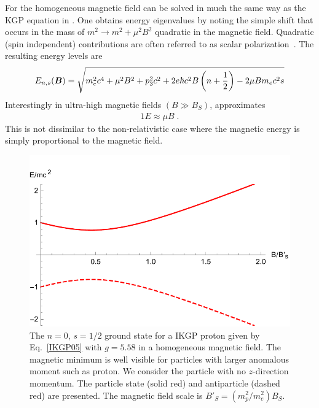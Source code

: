 For the homogeneous magnetic field  can be solved in much the same way as the KGP equation in . One obtains energy eigenvalues by noting the simple shift that occurs in the mass of $m^2\rightarrow m^{2}+\mu^{2}{B}^{2}$ quadratic in the magnetic field. Quadratic (spin independent) contributions are often referred to as scalar polarization~\citep{Holstein:2013kia}. The resulting energy levels are
\begin{alignat}{1}
\label{IKGP05} E_{n,s}(\boldsymbol{B})=\sqrt{m_{e}^{2}c^{4}+\mu^{2}{B}^{2}+p_{3}^{2}c^{2}+2e\hbar c^{2}B\left(n+\frac{1}{2}\right)-2\mu B m_{e}c^{2}s}
\end{alignat}
Interestingly in ultra-high magnetic fields $(B\gg{B}_{S})$,  approximates
\begin{alignat}{1}
\label{IKGP07} E\approx\mu B\;.
\end{alignat}
This is not dissimilar to the non-relativistic case where the magnetic energy is simply proportional to the magnetic field.

\begin{figure}[ht]
 \centering
 \includegraphics[clip, trim=0.0cm 0.0cm 0.0cm 0.5cm,width=\linewidth]{plots/chap02moment/lanplot09.pdf}
 \caption{The $n=0$, $s=1/2$ ground state for a IKGP proton given by Eq.~\eqref{IKGP05} with $g=5.58$ in a homogeneous magnetic field. The magnetic minimum is well visible for particles with larger anomalous moment such as proton. We consider the particle with no $z$-direction momentum. The particle state (solid red) and antiparticle (dashed red) are presented. The magnetic field scale is ${B}'_{S}=(m^2_p/m^2_e)B_{S}$.}
\label{f05}
\end{figure}

